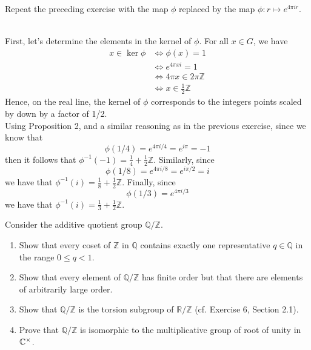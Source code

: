 \begin{exercise}
    Repeat the preceding exercise with the map $\phi$ replaced by the map $\phi : r \mapsto e^{4\pi ir}$. \\
\end{exercise}

\begin{solution}
    \\ First, let's determine the elements in the kernel of $\phi$. For all $x \in G$, we have
    \begin{align*}
        x \in \ker \phi &\iff \phi(x) = 1 \\
        &\iff e^{4\pi xi} = 1 \\
        &\iff 4\pi x \in 2\pi \mathbb{Z} \\
        &\iff x \in \frac{1}{2}\mathbb{Z}
    \end{align*}
    Hence, on the real line, the kernel of $\phi$ corresponds to the integers points scaled by down by a factor of 1/2. \\
    Using Proposition 2, and a similar reasoning as in the previous exercise, since we know that 
    $$\phi(1/4) = e^{4\pi i /4} = e^{i\pi} = -1$$
    then it follows that $\phi^{-1}(-1) = \frac{1}{4} + \frac{1}{2}\mathbb{Z}$. Similarly, since 
    $$\phi(1/8) = e^{4\pi i /8} = e^{i\pi/2} = i$$
    we have that $\phi^{-1}(i) = \frac{1}{8} + \frac{1}{2}\mathbb{Z}$. Finally, 
    since 
    $$\phi(1/3) = e^{4\pi i/3}$$
    we have that $\phi^{-1}(i) = \frac{1}{3} + \frac{1}{2}\mathbb{Z}$. \\
\end{solution}

\begin{exercise}
    Consider the additive quotient group $\mathbb{Q/Z}$.
    \begin{enumerate}[label = \textbf{(\alph*)}]
        \item Show that every coset of $\mathbb{Z}$ in $\mathbb{Q}$ contains exactly one representative $q \in \mathbb{Q}$ in the range $0 \leq q < 1$.
        \item Show that every element of $\mathbb{Q/Z}$ has finite order but that there are elements of arbitrarily large order.
        \item Show that $\mathbb{Q/Z}$ is the torsion subgroup of $\mathbb{R/Z}$ (cf. Exercise 6, Section 2.1).
        \item Prove that $\mathbb{Q/Z}$ is isomorphic to the multiplicative group of root of unity in $\mathbb{C}^{\times}$.\\
    \end{enumerate}
\end{exercise}

